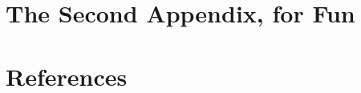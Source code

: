 \documentclass[12pt,twoside]{reedthesis}
\begin{document}
\hypertarget{the-second-appendix-for-fun}{%
\chapter{The Second Appendix, for Fun}\label{the-second-appendix-for-fun}}

\backmatter

\hypertarget{references}{%
\chapter*{References}\label{references}}


\noindent

\setlength{\parindent}{-0.20in}
\setlength{\leftskip}{0.20in}
\setlength{\parskip}{8pt}
\end{document}
